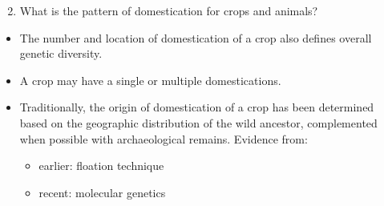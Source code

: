 \documentclass[
  ignorenonframetext,
  aspectratio=169]{beamer}
\providecommand{\tightlist}{%
  \setlength{\itemsep}{0pt}\setlength{\parskip}{0pt}}
\begin{document}
\begin{frame}{}
\protect\hypertarget{section-13}{}
\footnotesize

\begin{enumerate}[<+->]
\setcounter{enumi}{1}
\tightlist
\item
  \alert{What is the pattern of domestication for crops and animals?}
\end{enumerate}

\begin{itemize}[<+->]
\tightlist
\item
  The number and location of domestication of a crop also defines
  overall genetic diversity.
\item
  A crop may have a single or multiple domestications.
\item
  Traditionally, the origin of domestication of a crop has been
  determined based on the geographic distribution of the wild ancestor,
  complemented when possible with archaeological remains. Evidence from:

  \begin{itemize}[<+->]
  \tightlist
  \item
    earlier: floation technique
  \item
    recent: molecular genetics
  \end{itemize}
\end{itemize}
\end{frame}
\end{document}
